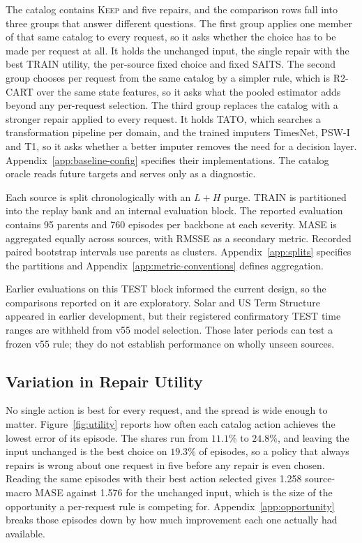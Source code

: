 \documentclass{article}
\begin{document}
The catalog contains \textsc{Keep} and five repairs, and the comparison rows fall into three
groups that answer different questions. The first group applies one member of that same
catalog to every request, so it asks whether the choice has to be made per request at all. It
holds the unchanged input, the single repair with the best TRAIN utility, the per-source fixed
choice and fixed SAITS. The second group chooses per request from the same catalog by a
simpler rule, which is R2-CART over the same state features, so it asks what the pooled
estimator adds beyond any per-request selection. The third group replaces the catalog with a
stronger repair applied to every request. It holds TATO, which searches a transformation
pipeline per domain, and the trained imputers TimesNet, PSW-I and T1, so it asks whether a
better imputer removes the need for a decision layer. Appendix~\ref{app:baseline-config}
specifies their implementations. The catalog oracle reads future targets and serves only as a
diagnostic.

Each source is split chronologically with an $L+H$ purge. TRAIN is partitioned into the
replay bank and an internal evaluation block. The reported evaluation contains 95 parents
and 760 episodes per backbone at each severity. MASE is aggregated equally across sources,
with RMSSE as a secondary metric. Recorded paired bootstrap intervals use parents as clusters.
Appendix~\ref{app:splits} specifies the partitions and Appendix~\ref{app:metric-conventions}
defines aggregation.

Earlier evaluations on this TEST block informed the current design, so the comparisons
reported on it are exploratory. Solar and US Term Structure appeared in earlier development,
but their registered confirmatory TEST time ranges are withheld from v55 model selection.
Those later periods can test a frozen v55 rule; they do not establish performance on wholly
unseen sources.

\subsection{Variation in Repair Utility}
\label{sec:exp-exists}
No single action is best for every request, and the spread is wide enough to matter.
Figure~\ref{fig:utility} reports how often each catalog action achieves the lowest error of
its episode. The shares run from $11.1\%$ to $24.8\%$, and leaving the input unchanged is the
best choice on $19.3\%$ of episodes, so a policy that always repairs is wrong about one
request in five before any repair is even chosen. Reading the same episodes with their
best action selected gives 1.258 source-macro MASE against 1.576 for the unchanged input,
which is the size of the opportunity a per-request rule is competing for.
Appendix~\ref{app:opportunity} breaks those episodes down by how much improvement each one
actually had available.
\end{document}
